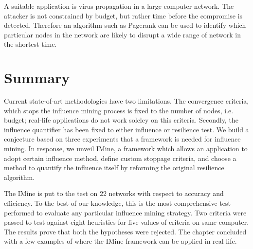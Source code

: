 		A suitable application is virus propagation in a large computer network. The attacker is not constrained by budget, but rather time before the compromise is detected. Therefore an algorithm such as Pagerank can be used to identify which particular nodes in the network are likely to disrupt a wide range of network in the shortest time.
		

	\section{Summary}
	Current state-of-art methodologies have two limitations. The convergence criteria, which stops the influence mining process is fixed to the number of nodes, i.e. budget; real-life applications do not work soleley on this criteria. Secondly, the influence quantifier has been fixed to either influence or resilience test. We build a conjecture based on three experiments that a framework is needed for influence mining. In response, we unveil IMine, a framework which allows an application to adopt certain influence method, define custom stoppage criteria, and choose a method to quantify the influence itself by reforming the original resilience algorithm.
	
	The IMine is put to the test on 22 networks with respect to accuracy and efficiency. To the best of our knowledge, this is the most comprehensive test performed to evaluate any particular influence mining strategy. Two criteria were passed to test against eight heuristics for five values of criteria on same computer. The results prove that both the hypotheses were rejected. The chapter concluded with a few examples of where the IMine framework can be applied in real life.
